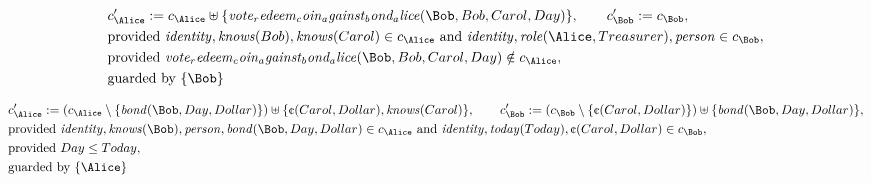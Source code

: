 \begin{align*}
&
c'_
{
\Alice
}
 := 
c_
{
\Alice
}
 \uplus 
\{
\mathit{
vote_redeem_coin_against_bond_alice
}
(
\Bob
,
Bob
,
Carol
,
Day
)
\}
, \qquad 
c'_
{
\Bob
}
 := 
c_
{
\Bob
}
,\\
&
\text{provided } 
\mathit{
identity
}
,
\mathit{
knows
}
(
Bob
)
,
\mathit{
knows
}
(
Carol
)
 \in c_
{
\Alice
}
 \text{ and } 
\mathit{
identity
}
,
\mathit{
role
}
(
\Alice
,
Treasurer
)
,
\mathit{
person
}
 \in c_
{
\Bob
}
,\\
&
\text{provided } 
\mathit{
vote_redeem_coin_against_bond_alice
}
(
\Bob
,
Bob
,
Carol
,
Day
)
 \notin c_
{
\Alice
}
,\\
&
\text{guarded by } \{
\Bob
\}
\end{align*}

\begin{align*}
&
c'_
{
\Alice
}
 := 
(c_
{
\Alice
}
 \setminus 
\{
\mathit{
bond
}
(
\Bob
,
Day
,
Dollar
)
\}
) \uplus 
\{
\text{\textcent}
(
Carol
,
Dollar
)
,
\mathit{
knows
}
(
Carol
)
\}
, \qquad 
c'_
{
\Bob
}
 := 
(c_
{
\Bob
}
 \setminus 
\{
\text{\textcent}
(
Carol
,
Dollar
)
\}
) \uplus 
\{
\mathit{
bond
}
(
\Bob
,
Day
,
Dollar
)
\}
,\\
&
\text{provided } 
\mathit{
identity
}
,
\mathit{
knows
}
(
\Bob
)
,
\mathit{
person
}
,
\mathit{
bond
}
(
\Bob
,
Day
,
Dollar
)
 \in c_
{
\Alice
}
 \text{ and } 
\mathit{
identity
}
,
\mathit{
today
}
(
Today
)
,
\text{\textcent}
(
Carol
,
Dollar
)
 \in c_
{
\Bob
}
,\\
&
\text{provided } 
Day
\le
Today
,\\
&
\text{guarded by } \{
\Alice
\}
\end{align*}

